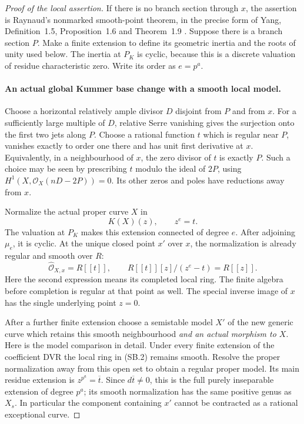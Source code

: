 \begin{proof}[Proof of the local assertion]
If there is no branch section through \(x\), the assertion is
Raynaud's nonmarked smooth-point theorem, in the precise form
of Yang, Definition~1.5, Proposition~1.6 and Theorem~1.9
\cite{fghYang2024}. Suppose there is a branch section \(P\).
Make a finite extension to define its geometric inertia and
the roots of unity used below. The inertia at \(P_K\) is
cyclic, because this is a discrete valuation of residue
characteristic zero. Write its order as \(e=p^a\).

\paragraph{An actual global Kummer base change with a smooth local model.}
Choose a horizontal relatively ample divisor \(D\) disjoint
from \(P\) and from \(x\). For a sufficiently large multiple
of \(D\), relative Serre vanishing gives the surjection onto
the first two jets along \(P\). Choose a rational function
\(t\) which is regular near \(P\), vanishes exactly to
order one there and has unit first derivative at \(x\).
Equivalently, in a neighbourhood of \(x\), the zero divisor
of \(t\) is exactly \(P\). Such a choice may be seen by
prescribing \(t\) modulo the ideal of \(2P\), using
\(H^1(X,\mathcal O_X(nD-2P))=0\). Its other zeros and
poles have reductions away from \(x\).

Normalize the actual proper curve \(X\) in
\[
                    K(X)(z),\qquad z^e=t.                 \tag{SB.1}
\]
The valuation at \(P_K\) makes this extension connected
of degree \(e\). After adjoining \(\mu_e\), it is cyclic.
At the unique closed point \(x'\) over \(x\), the
normalization is already regular and smooth over \(R\):
\[
 \widehat{\mathcal O}_{X,x}=R[[t]],\qquad
 R[[t]][z]/(z^e-t)=R[[z]].                               \tag{SB.2}
\]
Here the second expression means its completed local ring.
The finite algebra before completion is regular at that
point as well. The special inverse image of \(x\) has
the single underlying point \(z=0\).

After a further finite extension choose a semistable model
\(X'\) of the new generic curve which retains this smooth
neighbourhood \emph{and an actual morphism to \(X\)}.
Here is the model comparison in detail. Under every finite
extension of the coefficient DVR the local ring in (SB.2)
remains smooth. Resolve the proper normalization away from
this open set to obtain a regular proper model. Its main
residue extension is
\(z^{p^a}=\overline t\). Since \(d\overline t\ne0\),
this is the full purely inseparable extension of degree
\(p^a\); its smooth normalization has the same positive
genus as \(X_s\). In particular the component containing
\(x'\) cannot be contracted as a rational exceptional curve.


\end{proof}
